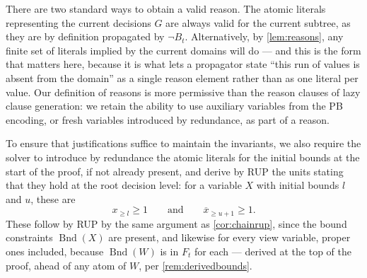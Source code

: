 \documentclass[11pt,a4paper]{article}
\theoremstyle{plain}
\theoremstyle{definition}
\theoremstyle{remark}
\newcommand{\fname}[1]{\ensuremath{\operatorname{#1}}}
\newcommand{\Bnd}{\fname{Bnd}}
\newcommand{\atge}[2]{#1_{\geq #2}}
\newcommand{\natge}[2]{\overline{#1}_{\geq #2}}
\begin{document}
There are two standard ways to obtain a valid reason.  The atomic literals
representing the current decisions $G$ are always valid for the current subtree,
as they are by definition propagated by $\neg B_t$.  Alternatively, by
\cref{lem:reasons}, any finite set of literals implied by the current domains
will do --- and this is the form that matters here, because it is what lets a
propagator state ``this run of values is absent from the domain'' as a single
reason element rather than as one literal per value.  Our definition of reasons
is more permissive than the reason clauses of lazy clause generation: we retain
the ability to use auxiliary variables from the PB encoding, or fresh variables
introduced by redundance, as part of a reason.

To ensure that justifications suffice to maintain the invariants, we also
require the solver to introduce by redundance the atomic literals for the
initial bounds at the start of the proof, if not already present, and derive by
RUP the units stating that they hold at the root decision level: for a variable
$X$ with initial bounds $l$ and $u$, these are
\begin{equation}
  \atge{x}{l}\geq 1 \qquad\text{and}\qquad \natge{x}{u+1}\geq 1 .
  \label{eq:rootbounds}
\end{equation}
These follow by RUP by the same argument as \cref{cor:chainrup}, since the bound
constraints $\Bnd(X)$ are present, and likewise for every view variable, proper
ones included, because $\Bnd(W)$ is in $F_t$ for each --- derived at the top of
the proof, ahead of any atom of $W$, per \cref{rem:derivedbounds}.
\end{document}

